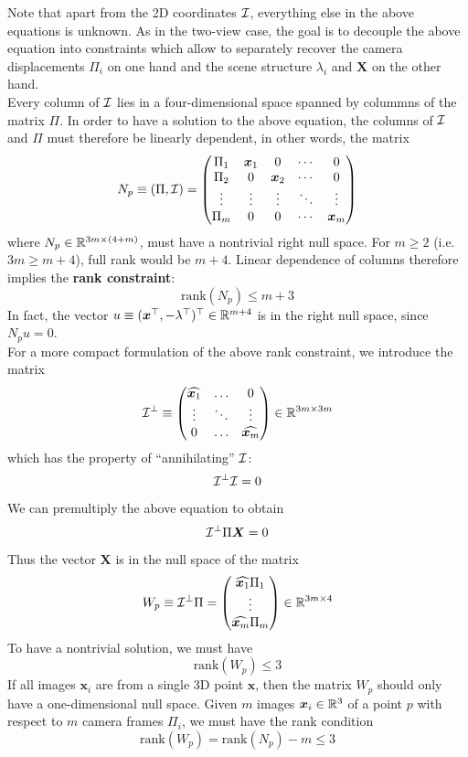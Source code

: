 Note that apart from the 2D coordinates $\mathcal{I}$, everything else in the above
equations is unknown. As in the two-view case, the goal is to decouple
the above equation into constraints which allow to separately recover
the camera displacements $\Pi_i$ on one hand and the scene
structure $\lambda_i$ and $\bm{X}$ on the other hand.\\

Every column of $\mathcal{I}$ lies in a four-dimensional space spanned by colummns
of the matrix $\Pi$. In order to have a solution to the above equation,
the columns of $\mathcal{I}$ and $\Pi$ must therefore be linearly dependent,
in other words, the matrix
\[
	N_p \equiv (\Pi, \mathcal{I})
	= \begin{pmatrix}
		\Pi_1 & \bm{x}_1 & 0 & \cdots & 0 \\
		\Pi_2 & 0 & \bm{x}_2 & \cdots & 0 \\
		\vdots & \vdots & \vdots & \ddots & \vdots \\
		\Pi_m & 0 & 0 & \cdots & \bm{x}_m
	\end{pmatrix}
\]
where $N_p \in \mathbb{R}^{3m \times{} (4+m)}$, must have a nontrivial right null space.
For $m \geq 2$ (i.e. $3m \geq m + 4$), full rank would be $m+4$.
Linear dependence of columns therefore implies the \textbf{rank constraint}:
\[
	\boxed{\text{rank}(N_p) \leq m + 3 }
\]
In fact, the vector $u \equiv ( \bm{x}^{\top}, - \lambda^{\top} )^{\top} \in \mathbb{R}^{m+4}$
is in the right null space, since $N_p u = 0$.\\

For a more compact formulation of the above rank constraint,
we introduce the matrix
\[
	\mathcal{I}^{\bot} \equiv
		\begin{pmatrix} {\widehat{\bm{x}_1}} & \ldots & 0 \\ \vdots & \ddots & \vdots \\ 0 & \ldots & {\widehat{\bm{x}_m}} \end{pmatrix}
		\in \mathbb{R}^{3m \times{} 3m}
\]
which has the property of ``annihilating'' $\mathcal{I}$:
\[
	\mathcal{I}^{\bot} \mathcal{I} = 0
\]
We can premultiply the above equation to obtain
\[
	\mathcal{I}^{\bot} \Pi \bm{X} = 0
\]
Thus the vector $\bm{X}$ is in the null space of the matrix
\[
	W_p
		\equiv \mathcal{I}^{\bot} \Pi
		= \begin{pmatrix}
			\widehat{\bm{x}_1} \Pi_1 \\ \vdots \\ \widehat{\bm{x}_m} \Pi_m
		\end{pmatrix}
		\in \mathbb{R}^{3m \times{} 4}
\]
To have a nontrivial solution, we must have
\[
	\text{rank}(W_p) \leq 3
\]
If all images $\bm{x}_i$ are from a single 3D point $\bm{x}$,
then the matrix $W_p$ should only have a one-dimensional null space.
Given $m$ images $\bm{x}_i \in \mathbb{R}^3$ of a point $p$ with respect to $m$ camera
frames $\Pi_i$, we must have the rank condition
\[
	\boxed{\text{rank}(W_p) = \text{rank}(N_p) - m \leq 3}
\]



